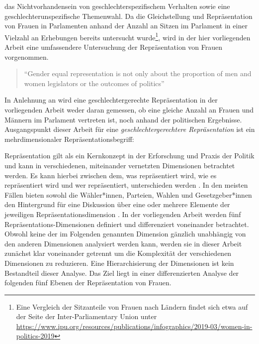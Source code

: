 \documentclass[12pt, 
    twoside=false, 
    bibliography=totoc, 
    numbers=endperiod, 
    headings=normal, 
    toc=chapterentrydotfill
    ]{scrbook}
\begin{document}
das Nichtvorhandensein von geschlechterspezifischem Verhalten sowie eine geschlechterunspezifische Themenwahl. Da die Gleichstellung und Repräsentation von Frauen in Parlamenten anhand der Anzahl an Sitzen im Parlament in einer Vielzahl an Erhebungen bereits untersucht wurde\footnote{Eine Vergleich der Sitzanteile von Frauen nach Ländern findet sich etwa auf der Seite der Inter-Parliamentary Union unter \url{https://www.ipu.org/resources/publications/infographics/2019-03/women-in-politics-2019}}, wird in der hier vorliegenden Arbeit eine umfassendere Untersuchung der Repräsentation von Frauen vorgenommen. 

\citereset
\begin{quote}
     \enquote{Gender equal representation is not only about the proportion of men and women legislators or the outcomes of politics}\parencite[197]{erikson_2018}
 \end{quote}

In Anlehnung an \textcite{erikson_2018} wird eine geschlechtergerechte Repräsentation in der vorliegenden Arbeit weder daran gemessen, ob eine gleiche Anzahl an Frauen und Männern im Parlament vertreten ist, noch anhand der politischen Ergebnisse. Ausgangspunkt dieser Arbeit für eine \emph{geschlechtergerechtere Repräsentation} ist ein mehrdimensionaler Repräsentationsbegriff:

Repräsentation gilt als ein Kernkonzept in der Erforschung und Praxis der Politik und kann in verschiedenen, miteinander vernetzten Dimensionen betrachtet werden. Es kann hierbei zwischen dem, was repräsentiert wird, wie es repräsentiert wird und wer repräsentiert, unterschieden werden \parencite[557]{galligan_2007}. In den meisten Fällen bieten sowohl die Wähler*innen, Parteien, Wahlen und Gesetzgeber*innen den Hintergrund für eine Diskussion über eine oder mehrere Elemente der jeweiligen Repräsentationsdimension \parencite[557]{galligan_2007}.
In der vorliegenden Arbeit werden fünf Repräsentations-Dimensionen definiert und differenziert voneinander betrachtet. Obwohl keine der im Folgenden genannten Dimension gänzlich unabhängig von den anderen Dimensionen analysiert werden kann, werden sie in dieser Arbeit zunächst klar voneinander getrennt um die Komplexität der verschiedenen Dimensionen zu reduzieren. Eine Hierarchisierung der Dimensionen ist kein Bestandteil dieser Analyse. Das Ziel liegt in einer differenzierten Analyse der folgenden fünf Ebenen der Repräsentation von Frauen.
\end{document}
